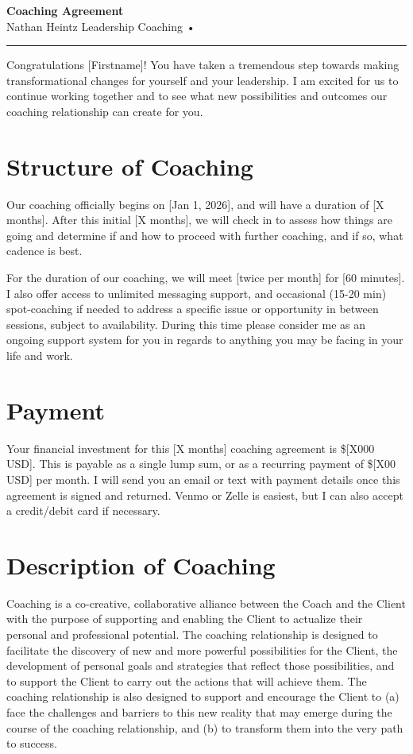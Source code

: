 \documentclass[11pt,letterpaper]{article}
\newcommand{\agreementdate}{[Jan 1, 2026]}
\newcommand{\clientfirstname}{[Firstname]}
\newcommand{\startdate}{[Jan 1, 2026]}
\newcommand{\cadence}{[twice per month]}
\newcommand{\sessionlength}{[60 minutes]}
\newcommand{\duration}{[X months]}
\newcommand{\amount}{[X000 USD]}
\newcommand{\monthlyamount}{[X00 USD]}
\begin{document}
{\centering
{\huge\textbf{Coaching Agreement}} \\[0.5em]
{\large Nathan Heintz Leadership Coaching \quad • \quad \agreementdate} \\[1.5em]
\hrule
\vspace{1em}
}

Congratulations \clientfirstname! You have taken a tremendous step towards making transformational changes for yourself and your leadership. I am excited for us to continue working together and to see what new possibilities and outcomes our coaching relationship can create for you.

\section*{Structure of Coaching}
Our coaching officially begins on \startdate, and will have a duration of \duration. After this initial \duration, we will check in to assess how things are going and determine if and how to proceed with further coaching, and if so, what cadence is best.

For the duration of our coaching, we will meet \cadence{} for \sessionlength{}. I also offer access to unlimited messaging support, and occasional (15-20 min) spot-coaching if needed to address a specific issue or opportunity in between sessions, subject to availability. During this time please consider me as an ongoing support system for you in regards to anything you may be facing in your life and work.

\section*{Payment}
Your financial investment for this \duration{} coaching agreement is \$\amount. This is payable as a single lump sum, or as a recurring payment of \$\monthlyamount{} per month. I will send you an email or text with payment details once this agreement is signed and returned. Venmo or Zelle is easiest, but I can also accept a credit/debit card if necessary.

\section*{Description of Coaching}
Coaching is a co-creative, collaborative alliance between the Coach and the Client with the purpose of supporting and enabling the Client to actualize their personal and professional potential. The coaching relationship is designed to facilitate the discovery of new and more powerful possibilities for the Client, the development of personal goals and strategies that reflect those possibilities, and to support the Client to carry out the actions that will achieve them. The coaching relationship is also designed to support and encourage the Client to (a) face the challenges and barriers to this new reality that may emerge during the course of the coaching relationship, and (b) to transform them into the very path to success.
\end{document}
